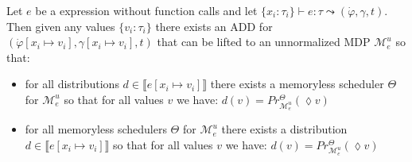 \begin{theorem}\label{UnnormalizedCorrespondence}
	Let $e$ be a \NDICE expression without function calls 
	and let $\{x_i\colon \tau_i\} \vdash e \colon \tau \leadsto (\dot{\varphi}, \gamma, t)$. Then given any values $\{v_i\colon \tau_i\}$ there exists an ADD for $(\dot{\varphi}[x_i\mapsto v_i], \gamma[x_i\mapsto v_i], t)$ that can be lifted to an unnormalized MDP $\mathcal{M}^u_e$ so that:
	\begin{itemize}
		\item for all distributions $d \in \llbracket e[x_i\mapsto v_i] \rrbracket$ there exists a memoryless scheduler $\Theta$ for $\mathcal{M}^u_e$ so that for all values $v$ we have: $d(v) = Pr^\Theta_{\mathcal{M}^u_e}(\lozenge v)$
		\item for all memoryless schedulers $\Theta$ for $\mathcal{M}^u_e$ there exists a distribution $d \in \llbracket e[x_i\mapsto v_i] \rrbracket$ so that for all values $v$ we have: $d(v) = Pr^\Theta_{\mathcal{M}^u_e}(\lozenge v)$
	\end{itemize} 
\end{theorem}
